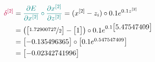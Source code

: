\documentclass[12pt]{article}
\begin{document}
\begin{enumerate}[leftmargin=\labelsep]
        \pagebreak


        \begin{equation*}
          \begin{aligned}
            \textcolor{purple}{\delta^{[2]}} &= \textcolor{teal}{\frac{\partial E}{\partial x^{[2]}} \circ
            \frac{\partial x^{[2]}}{\partial z^{[2]}}}
            = (x^{[2]} - z_i) \circ 0.1e^{0.1z^{[2]}} \\
            &= \left(
              \begin{bmatrix}
                \nicefrac{1.72900727}{2}
              \end{bmatrix} - \begin{bmatrix}
                1
              \end{bmatrix}
            \right) \circ 0.1e^{0.1 \begin{bmatrix}
              5.47547409
            \end{bmatrix}} \\
            &= \begin{bmatrix}
              - 0.135496365
              \end{bmatrix} \circ \begin{bmatrix} 0.1e^{0.547547409} \end{bmatrix}\\
            &= \begin{bmatrix}
              - 0.02342741996
              \end{bmatrix}
          \end{aligned}
        \end{equation*}


\end{enumerate}
\end{document}
